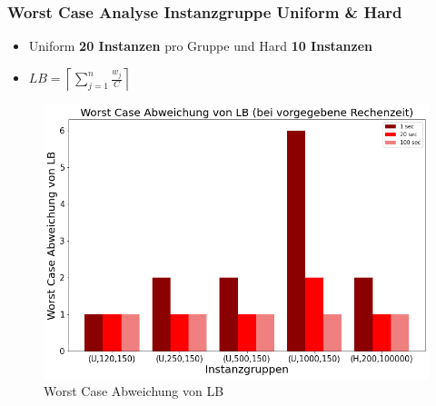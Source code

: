 \documentclass{beamer}
\begin{document}
\begin{frame}

\frametitle{Worst Case Analyse Instanzgruppe Uniform \& Hard}
\begin{footnotesize}
\begin{itemize}
\item Uniform \textbf{20 Instanzen} pro Gruppe und Hard \textbf{10 Instanzen}
\item $LB = \left\lceil\sum_{j=1}^{n} \frac{w_j}{C}\right\rceil$
\end{itemize}
\end{footnotesize}
\begin{figure}[!htbp]
\begin{center}
\includegraphics[scale=0.3]{img/wc_unif_hard.png}
\end{center}
\caption{Worst Case Abweichung von LB}
\label{fig:WC}
\end{figure}



\end{frame}
\end{document}
